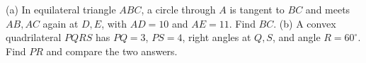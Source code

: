 (a) In equilateral triangle $ABC$, a circle through $A$ is tangent to $BC$ and meets $AB,AC$ again at $D,E$, with $AD=10$ and $AE=11$. Find $BC$. (b) A convex quadrilateral $PQRS$ has $PQ=3$, $PS=4$, right angles at $Q,S$, and angle $R=60^\circ$. Find $PR$ and compare the two answers.
